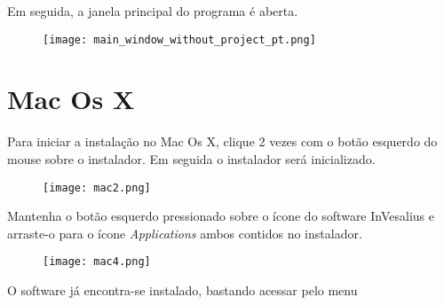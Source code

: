 Em seguida, a janela principal do programa é aberta.

\begin{figure}[!htb]
\centering
\texttt{[image: main\_window\_without\_project\_pt.png]}
\end{figure}

\section{Mac Os X}

Para iniciar a instalação no Mac Os X, clique 2 vezes com o botão esquerdo do mouse sobre o instalador.
Em seguida o instalador será inicializado.

\begin{figure}[!htb]
\centering
\texttt{[image: mac2.png]}
\end{figure}

Mantenha o botão esquerdo pressionado sobre o ícone do software InVesalius e arraste-o para o ícone \textit{Applications}
ambos contidos no instalador.

\begin{figure}[!htb]
\centering
\texttt{[image: mac4.png]}
\end{figure}

O software já encontra-se instalado, bastando acessar pelo menu
